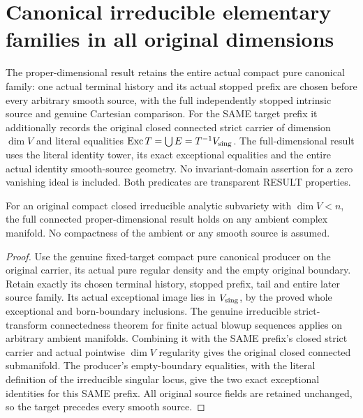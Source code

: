 \section{Canonical irreducible elementary families in all original dimensions}

\begin{definition}
\label{hir:original-canonical-irreducible-family-results}
\leanok
The proper-dimensional result retains the entire actual compact pure
canonical family: one actual terminal history and its actual stopped
prefix are chosen before every arbitrary smooth source, with the
full independently stopped intrinsic source and genuine Cartesian
comparison. For the SAME target prefix it additionally records the
original closed connected strict carrier of dimension $\dim V$ and
literal equalities $\operatorname{Exc}T=\bigcup E=T^{-1}V_{\rm sing}$.
The full-dimensional result uses the literal identity tower, its exact
exceptional equalities and the entire actual identity smooth-source
geometry. No invariant-domain assertion for a zero vanishing ideal
is included. Both predicates are transparent RESULT properties.
\end{definition}

\begin{theorem}
\label{hir:original-canonical-irreducible-proper-connected}
\leanok
For an original compact closed irreducible analytic subvariety with
$\dim V<n$, the full connected proper-dimensional result holds on
any ambient complex manifold. No compactness of the ambient or any
smooth source is assumed.
\end{theorem}
\begin{proof}
Use the genuine fixed-target compact pure canonical producer on the
original carrier, its actual pure regular density and the empty
original boundary. Retain exactly its chosen terminal history,
stopped prefix, tail and entire later source family. Its actual
exceptional image lies in $V_{\rm sing}$, by the proved whole
exceptional and born-boundary inclusions. The genuine irreducible
strict-transform connectedness theorem for finite actual blowup
sequences applies on arbitrary ambient manifolds. Combining it with
the SAME prefix's closed strict carrier and actual pointwise
$\dim V$ regularity gives the original closed connected submanifold.
The producer's empty-boundary equalities, with the literal definition
of the irreducible singular locus, give the two exact exceptional
identities for this SAME prefix. All original source fields are
retained unchanged, so the target precedes every smooth source.
\end{proof}

